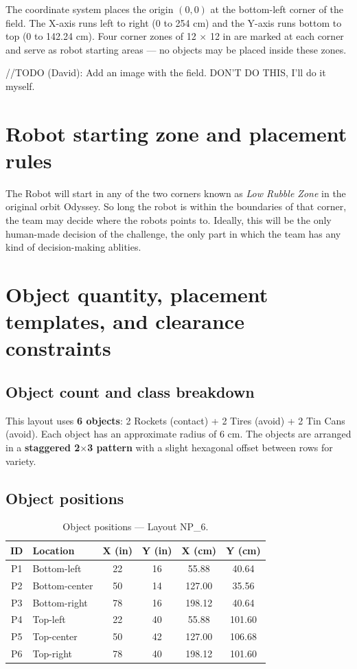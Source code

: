 \documentclass[a4]{article}
\begin{document}
The coordinate system places the origin $(0, 0)$ at the bottom-left corner of the field. The X-axis runs left to right (0 to 254 cm) and the Y-axis runs bottom to top (0 to 142.24 cm). Four corner zones of 12 $\times$ 12 in are marked at each corner and serve as robot starting areas --- no objects may be placed inside these zones.

//TODO (David): Add an image with the field. DON'T DO THIS, I'll do it myself. 

\section*{Robot starting zone and placement rules}
The Robot will start in any of the two corners known as \textit{Low Rubble Zone} in the original orbit Odyssey. So long the robot is within the boundaries of that corner, the team may decide where the robots points to. Ideally, this will be the only human-made decision of the challenge, the only part in which the team has any kind of decision-making ablities. 

\section*{Object quantity, placement templates, and clearance constraints}
\subsection*{Object count and class breakdown}
This layout uses \textbf{6 objects}: 2 Rockets (contact) + 2 Tires (avoid) + 2 Tin Cans (avoid). Each object has an approximate radius of 6 cm. The objects are arranged in a \textbf{staggered 2$\times$3 pattern} with a slight hexagonal offset between rows for variety.

\subsection*{Object positions}

\begin{table}[H]
\centering
\begin{tabular}{clcccc}
\toprule
\textbf{ID} & \textbf{Location} & \textbf{X (in)} & \textbf{Y (in)} & \textbf{X (cm)} & \textbf{Y (cm)} \\
\midrule
P1 & Bottom-left & 22 & 16 & 55.88 & 40.64 \\
P2 & Bottom-center & 50 & 14 & 127.00 & 35.56 \\
P3 & Bottom-right & 78 & 16 & 198.12 & 40.64 \\
P4 & Top-left & 22 & 40 & 55.88 & 101.60 \\
P5 & Top-center & 50 & 42 & 127.00 & 106.68 \\
P6 & Top-right & 78 & 40 & 198.12 & 101.60 \\
\bottomrule
\end{tabular}
\caption{Object positions --- Layout NP\_6.}
\end{table}
\end{document}

